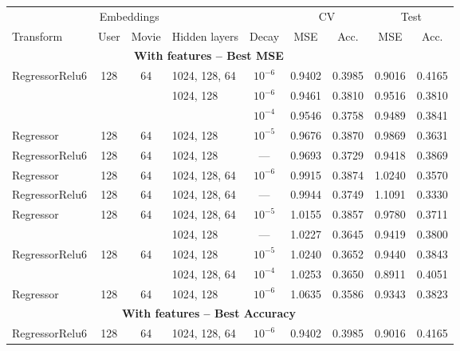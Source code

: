 \begin{table}
\centering
\small
\begin{tabular}{lcclccccc}
\toprule
           & \multicolumn{2}{c}{Embeddings} &  &   &  \multicolumn{2}{c}{CV} & \multicolumn{2}{c}{Test} \\
           \cmidrule(lr){2-3}\cmidrule(lr){6-7}\cmidrule(l){8-9}
Transform & User & Movie & Hidden layers &  Decay & MSE & Acc. & MSE & Acc.  \\
\midrule
\multicolumn{8}{c}{\textbf{With features -- Best MSE}}\\\addlinespace
RegressorRelu6 & 128 & 64 & 1024, 128, 64 & $10^{-6}$   &  0.9402 &      0.3985 &   0.9016 &        0.4165 \\
           &     &    & 1024, 128 & $10^{-6}$   &  0.9461 &      0.3810 &   0.9516 &        0.3810 \\
           &     &    &                                 & $10^{-4}$   &  0.9546 &      0.3758 &   0.9489 &        0.3841 \\
Regressor & 128 & 64 & 1024, 128 & $10^{-5}$   &  0.9676 &      0.3870 &   0.9869 &        0.3631 \\
RegressorRelu6 & 128 & 64 & 1024, 128 & ---   &  0.9693 &      0.3729 &   0.9418 &        0.3869 \\
Regressor & 128 & 64 & 1024, 128, 64 & $10^{-6}$   &  0.9915 &      0.3874 &   1.0240 &        0.3570 \\
RegressorRelu6 & 128 & 64 & 1024, 128, 64 & ---   &  0.9944 &      0.3749 &   1.1091 &        0.3330 \\
Regressor & 128 & 64 & 1024, 128, 64 & $10^{-5}$   &  1.0155 &      0.3857 &   0.9780 &        0.3711 \\
           &     &    & 1024, 128 & ---   &  1.0227 &      0.3645 &   0.9419 &        0.3800 \\
RegressorRelu6 & 128 & 64 & 1024, 128 & $10^{-5}$   &  1.0240 &      0.3652 &   0.9440 &        0.3843 \\
           &     &    & 1024, 128, 64 & $10^{-4}$   &  1.0253 &      0.3650 &   0.8911 &        0.4051 \\
Regressor & 128 & 64 & 1024, 128 & $10^{-6}$   &  1.0635 &      0.3586 &   0.9343 &        0.3823 \\
\midrule
\multicolumn{8}{c}{\textbf{With features -- Best Accuracy}}\\\addlinespace
RegressorRelu6 & 128 & 64 & 1024, 128, 64 & $10^{-6}$   &  0.9402 &      0.3985 &   0.9016 &        0.4165 \\

\end{tabular}
\end{table}

